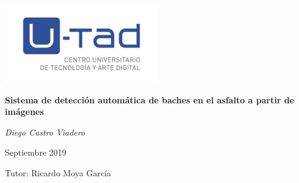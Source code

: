 \documentclass[]{article}
\begin{document}
\begin{titlepage}
	\centering
	\includegraphics[width=0.5\textwidth]{images/logo_utad.jpg}\par\vspace{1cm}
	{\large\bfseries Sistema de detección automática de baches en el asfalto a partir de imágenes\par}
	\vspace{1.5cm}
	{\large \itshape Diego Castro Viadero\par}
	Septiembre 2019\par
	\vspace{1.5cm}
	{\small Tutor: Ricardo Moya García}
\end{titlepage}





\newpage
{}
\tableofcontents{}

\newpage

\newpage

\newpage

\newpage

\newpage

\newpage

\newpage

\newpage

\newpage
\nocite{*}
\printbibliography[title={Referencias}]
\end{document}
